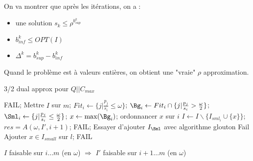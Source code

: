 \documentclass[a4paper, 11pt]{thesis}
\begin{document}
On va montrer que après les itérations, on a :
\begin{itemize}
    \item une solution $s_k \leq \rho^{b_{sup}^k}$
    \item $b_{inf}^k \leq OPT(I)$
    \item $\Delta^k  = b_{sup}^k - b_{inf}^k$
\end{itemize}


\begin{corol}
    Quand le problème est à valeurs entières, on obtient une "vraie" $\rho$ approximation. %
\end{corol}

\begin{algorithm}[h!]
    \caption{3/2 dual approx pour $Q | | C_{max}$}
    \label{32_dual_approx}
    \begin{algorithmic}[1]
                \State \Return FAIL;
            \Else
                \State Mettre $I$ sur $m$;
            \EndIf
        \Else
            \State $Fit_i \gets \{ j | \frac{p_j}{s_i} \leq \omega \}$;
            \State $\Bg_i \gets Fit_i \cap \{j | \frac{p_j}{s_i} > \frac{\omega}{2} \}$;
            \State $\Sml_i \gets \{ j | \frac{p_j}{s_i} \leq \frac{\omega}{2}\}$;
            \State $x \gets \max(\Bg_i)$;
            \State ordonnancer $x$ sur $i$
            \State $I \gets I \backslash \{ I_{sml_i} \cup \{x\}\}$;
            \State $res = A(\omega, I', i+1)$;
                \State \Return FAIL;
            \Else
                \State Essayer d'ajouter $I_{\Sml}$ avec algorithme glouton
                    \State \Return Fail
                \EndIf
            \EndIf
        \EndIf
        \EndFunction
                \State Ajouter $x \in I_{small}$ sur $l$;
            \EndWhile
                \State \Return FAIL
            \EndIf
        \EndFunction
    \end{algorithmic}
\end{algorithm}


\begin{lemma}
    $I$ faisable sur $i \dots m$ (en $\omega$) $\Rightarrow$ $I'$ faisable sur $i+1 \dots m$ (en
    $\omega$)
\end{lemma}
\end{document}
